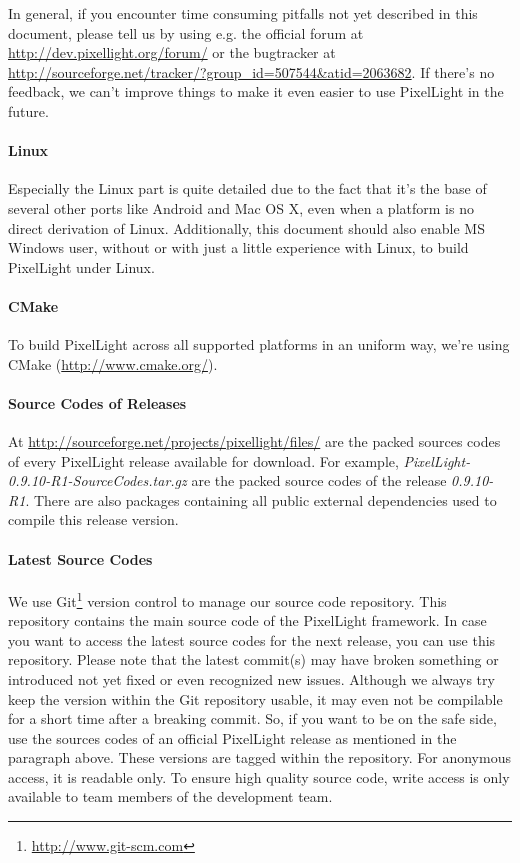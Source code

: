 In general, if you encounter time consuming pitfalls not yet described in this document, please tell us by using e.g. the official forum at \url{http://dev.pixellight.org/forum/} or the bugtracker at \url{http://sourceforge.net/tracker/?group_id=507544&atid=2063682}. If there's no feedback, we can't improve things to make it even easier to use PixelLight in the future.


\paragraph{Linux}
Especially the Linux part is quite detailed due to the fact that it's the base of several other ports like Android and Mac OS X, even when a platform is no direct derivation of Linux. Additionally, this document should also enable \ac{MS} Windows user, without or with just a little experience with Linux, to build PixelLight under Linux.


\paragraph{CMake}
To build PixelLight across all supported platforms in an uniform way, we're using CMake (\url{http://www.cmake.org/}).


\paragraph{Source Codes of Releases}
At \url{http://sourceforge.net/projects/pixellight/files/} are the packed sources codes of every PixelLight release available for download. For example, \emph{PixelLight-0.9.10-R1-SourceCodes.tar.gz} are the packed source codes of the release \emph{0.9.10-R1}. There are also packages containing all public external dependencies used to compile this release version.


\paragraph{Latest Source Codes}
We use Git\footnote{\url{http://www.git-scm.com}} version control to manage our source code repository. This repository contains the main source code of the PixelLight framework. In case you want to access the latest source codes for the next release, you can use this repository. Please note that the latest commit(s) may have broken something or introduced not yet fixed or even recognized new issues. Although we always try keep the version within the Git repository usable, it may even not be compilable for a short time after a breaking commit. So, if you want to be on the safe side, use the sources codes of an official PixelLight release as mentioned in the paragraph above. These versions are tagged within the repository. For anonymous access, it is readable only. To ensure high quality source code, write access is only available to team members of the development team.

